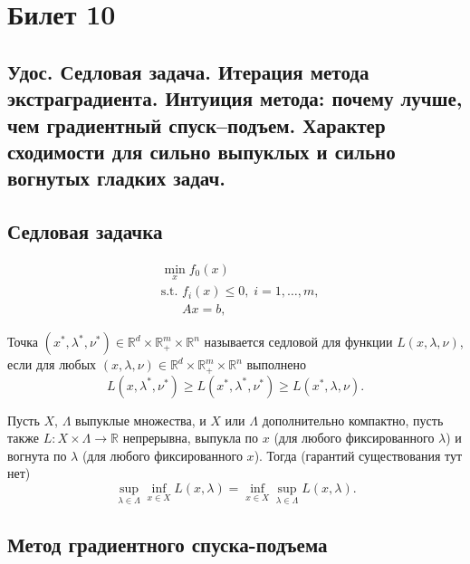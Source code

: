 \section{Билет 10}

\subsection{Удос. Седловая задача. Итерация метода экстраградиента. Интуиция метода:
    почему лучше, чем градиентный спуск–подъем. Характер сходимости
    для сильно выпуклых и сильно вогнутых гладких задач.}

\subsection*{Седловая задачка}

\begin{equation}
    \begin{aligned}
         & \min_{x} f_0(x)                                 \\
         & \text{s.t. } f_i(x) \leq 0, \; i = 1, \dots, m, \\
         & \phantom{\text{s.t. }} Ax = b,
    \end{aligned}
    \label{eq:horse}
\end{equation}

\begin{definition}
    Точка $(x^*, \lambda^*, \nu^*) \in \mathbb{R}^d \times \mathbb{R}_+^m \times \mathbb{R}^n$ называется седловой
    для функции $L(x, \lambda, \nu)$, если для любых
    $(x, \lambda, \nu) \in \mathbb{R}^d \times \mathbb{R}_+^m \times \mathbb{R}^n$ выполнено
    $$L(x, \lambda^*, \nu^*) \geq L(x^*, \lambda^*, \nu^*) \geq L(x^*, \lambda, \nu).$$
\end{definition}

\begin{theorem}
    Пусть $X$, $\Lambda$ выпуклые множества, и $X$ или $\Lambda$ дополнительно компактно,
    пусть также $L : X \times \Lambda \to \mathbb{R}$ непрерывна, выпукла по $x$ (для любого фиксированного $\lambda$) и
    вогнута по $\lambda$ (для любого фиксированного $x$). Тогда (гарантий существования тут нет)
    $$\sup_{\lambda \in \Lambda} \inf_{x \in X} L(x, \lambda) = \inf_{x \in X} \sup_{\lambda \in \Lambda} L(x, \lambda).$$
\end{theorem}

\subsection*{Метод градиентного спуска-подъема}

